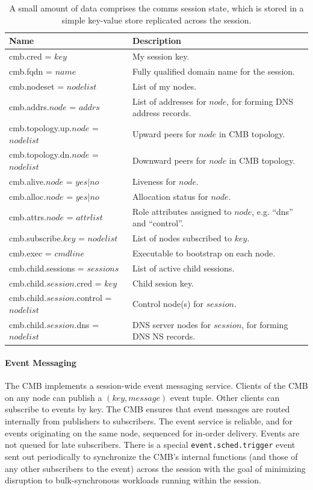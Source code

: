 \begin{table}
  \centering
  \begin{tabular}{| l | p{} |}\hline
  \textbf{Name} & \textbf{Description} \\
  \hline
  cmb.cred = $key$ &
        My session key.\\
  cmb.fqdn = $name$ &
        Fully qualified domain name for the session.\\
  cmb.nodeset = $nodelist$ &
        List of my nodes.\\
  cmb.addrs.$node$ = $addrs$ &
        List of addresses for $node$, for forming DNS address records.\\
  cmb.topology.up.$node$ = $nodelist$ & 
        Upward peers for $node$ in CMB topology.\\
  cmb.topology.dn.$node$ = $nodelist$ &
        Downward peers for $node$ in CMB topology.\\
  cmb.alive.$node$ = $yes|no$ &
        Liveness for $node$.\\
  cmb.alloc.$node$ = $yes|no$ &
        Allocation status for $node$.\\
  cmb.attrs.$node$ = $attrlist$ &
	Role attributes assigned to $node$, e.g. ``dns'' and ``control''.\\
  cmb.subscribe.$key$ = $nodelist$ &
        List of nodes subscribed to $key$.\\
  cmb.exec = $cmdline$ &
        Executable to bootstrap on each node.\\
  \hline
  cmb.child.sessions = $sessions$ &
        List of active child sessions.\\
  cmb.child.$session$.cred = $key$ &
        Child sesion key.\\
  cmb.child.$session$.control = $nodelist$ &
        Control node(s) for $session$.\\
  cmb.child.$session$.dns = $nodelist$ &
        DNS server nodes for $session$, for forming DNS NS records.\\
  \hline
  \end{tabular}
  \caption{A small amount of data comprises the comms session state,
	   which is stored in a simple key-value store replicated across
	   the session.}
  \label{TabCMBState}
\end{table}

\paragraph{Event Messaging}
The CMB implements a session-wide event messaging service.
Clients of the CMB on any node can publish a $(key, message)$ event tuple.
Other clients can subscribe to events by key.  The CMB ensures that
event messages are routed internally from publishers to subscribers.
The event service is reliable, and for events originating on the same node,
sequenced for in-order delivery.
Events are not queued for late subscribers.
There is a special {\tt event.sched.trigger} event sent out periodically
to synchronize the CMB's internal functions (and those of any other
subscribers to the event) across the session with the goal of minimizing
disruption to bulk-synchronous workloads running within the session.

